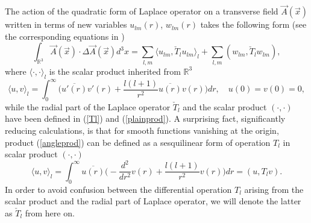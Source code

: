 \documentclass[12pt]{article}
\newcommand{\ol}{\overline}
\newcommand{\RR}{\mathbb{R}}
\begin{document}
	The action of the quadratic form of Laplace operator on a transverse field
$ \vec{A}(\vec{x}) $
	written in terms of new variables
$ u_{lm}(r) $,
$ w_{lm}(r) $
	takes the following form (see the corresponding equations in
\cite{Lapl})
\begin{equation*}
    \int_{\RR^{3}}\vec{A}(\vec{x})\cdot \Delta \vec{A}(\vec{x}) d^{3}x
	= \sum_{l,m}\langle u_{lm},\check{T}_{l}u_{lm}\rangle_{l}
	    + \sum_{l,m}(w_{lm},\check{T}_{l}w_{lm}) ,
\end{equation*}
	where
$ \langle \cdot , \cdot \rangle_{l} $
	is the scalar product inherited from 
$ \RR^{3} $
\begin{equation}
\label{angleprod}
    \langle u, v\rangle_{l} = \int_{0}^{\infty} \bigl(
	\ol{u'(r)}v'(r) + \frac{l(l+1)}{r^{2}} \ol{u(r)}v(r)\bigr) dr ,
    \quad u(0) = v(0) = 0,
\end{equation}
	while the radial part of the Laplace operator
$ \check{T}_{l} $
	and the scalar product
$ (\cdot,\cdot) $
	have been defined in
(\ref{Tl}) and
(\ref{plainprod}).
	A surprising fact, significantly reducing calculations, is that
	for smooth functions vanishing at the origin,
	product
(\ref{angleprod})
	can be defined as a sesquilinear form of operation
$ T_{l} $
	in scalar product
$ (\cdot,\cdot) $
\begin{equation}
\label{Tprod}
    \langle u,v\rangle_{l} = \int_{0}^{\infty} \ol{u(r)} \bigl(
	-\frac{d^{2}}{dr^{2}}v(r) + \frac{l(l+1)}{r^{2}}v(r) \bigr) dr
	= (u, T_{l}v).
\end{equation}
	In order to avoid confusion between the differential operation
$ T_{l} $
	arising from the scalar product and the radial part of Laplace operator,
	we will denote the latter as
$ \check{T}_{l} $
	from here on.
\end{document}
